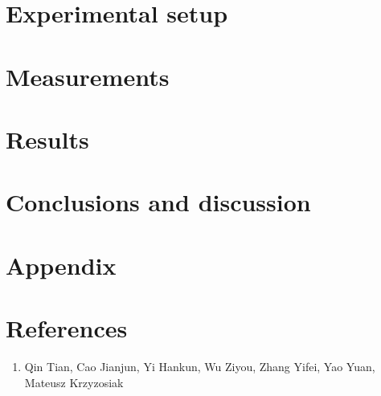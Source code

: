 \documentclass[12pt, a4paper]{article}
\begin{document}
\section{Experimental setup}


\section{Measurements}
	


\section{Results}



\section{Conclusions and discussion}


\newpage

\section{Appendix}


\section{References}
    \begin{enumerate}
        \item Qin Tian, Cao Jianjun, Yi Hankun, Wu Ziyou, Zhang Yifei, Yao Yuan, Mateusz Krzyzosiak
    \end{enumerate}
\end{document}
